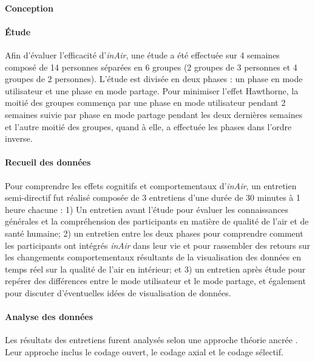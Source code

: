 \documentclass[10pt,a5paper,twoside]{article}
\begin{document}
\paragraph{Conception}\label{conception-2}

\paragraph{Étude}\label{uxe9tude-2}

Afin d'évaluer l'efficacité d'\emph{inAir}, une étude a été effectuée
sur 4 semaines composé de 14 personnes séparées en 6 groupes (2 groupes
de 3 personnes et 4 groupes de 2 personnes). L'étude est divisée en deux
phases : un phase en mode utilisateur et une phase en mode partage. Pour
minimiser l'effet Hawthorne, la moitié des groupes commença par une
phase en mode utilisateur pendant 2 semaines suivie par phase en mode
partage pendant les deux dernières semaines et l'autre moitié des
groupes, quand à elle, a effectuée les phases dans l'ordre inverse.

\paragraph{Recueil des données}\label{recueil-des-donnuxe9es-1}

Pour comprendre les effets cognitifs et comportementaux d'\emph{inAir},
un entretien semi-directif fut réalisé composée de 3 entretiens d'une
durée de 30 minutes à 1 heure chacune : 1) Un entretien avant l'étude
pour évaluer les connaissances générales et la compréhension des
participants en matière de qualité de l'air et de santé humaine; 2) un
entretien entre les deux phases pour comprendre comment les participants
ont intégrés \emph{inAir} dans leur vie et pour rassembler des retours
sur les changements comportementaux résultants de la visualisation des
données en temps réel sur la qualité de l'air en intérieur; et 3) un
entretien après étude pour repérer des différences entre le mode
utilisateur et le mode partage, et également pour discuter d'éventuelles
idées de visualisation de données.

\paragraph{Analyse des données}\label{analyse-des-donnuxe9es}

Les résultats des entretiens furent analysés selon une approche théorie
ancrée \citep{strauss1990basics}. Leur approche inclus le codage ouvert,
le codage axial et le codage sélectif.
\end{document}
